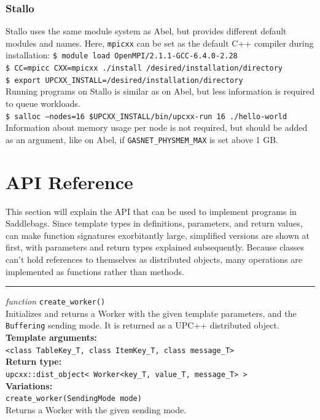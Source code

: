 \documentclass{uit-report}
\begin{document}
\subsection{Stallo}
Stallo uses the same module system as Abel, but provides different default modules and names. Here, \texttt{mpicxx} can be set as the default C++ compiler during installation:
\phantom{11111} \texttt{\$ module load OpenMPI/2.1.1-GCC-6.4.0-2.28}\\
\phantom{11111} \texttt{\$ CC=mpicc CXX=mpicxx ./install /desired/installation/directory}\\
\phantom{11111} \texttt{\$ export UPCXX\_INSTALL=/desired/installation/directory}\\

Running programs on Stallo is similar as on Abel, but less information is required to queue workloads.\\
\phantom{11111} \texttt{\$ salloc --nodes=16 \$UPCXX\_INSTALL/bin/upcxx-run 16 ./hello-world}\\
Information about memory usage per node is not required, but should be added as an argument, like on Abel, if \texttt{GASNET\_PHYSMEM\_MAX} is set above 1 GB.


\chapter{API Reference}
This section will explain the API that can be used to implement programs in Saddlebags. Since template types in definitions, parameters, and return values, can make function signatures exorbitantly large, simplified versions are shown at first, with parameters and return types explained subsequently. Because classes can't hold references to themselves as distributed objects, many operations are implemented as functions rather than methods.
\vskip 0.6cm
\begin{center}
	\noindent\rule{4cm}{1.2pt}
\end{center}
\vskip 0.5cm
\textit{function} \texttt{create\_worker()}\\
\phantom{11111} Initializes and returns a Worker with the given template parameters, and the \texttt{Buffering} sending mode. It is returned as a UPC++ distributed object. \\
\textbf{Template arguments:}\\
\phantom{11111} \texttt{<class TableKey\_T, class ItemKey\_T, class message\_T>}\\
\textbf{Return type:}\\
\phantom{11111}  \texttt{upcxx::dist\_object< Worker<key\_T, value\_T, message\_T> >}\\
\textbf{Variations:}\\
\phantom{11111} \texttt{create\_worker(SendingMode mode)}\\
\phantom{11111}\phantom{11111} Returns a Worker with the given sending mode.
\end{document}
